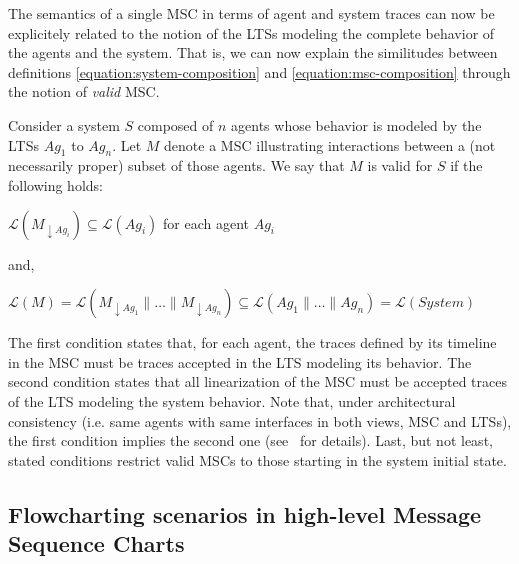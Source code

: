 The semantics of a single MSC in terms of agent and system traces can now be explicitely related to the notion of the LTSs modeling the complete behavior of the agents and the system. That is, we can now explain the similitudes between definitions \ref{equation:system-composition} and \ref{equation:msc-composition} through the notion of \emph{valid} MSC. 

Consider a system $S$ composed of $n$ agents whose behavior is modeled by the LTSs $Ag_1$ to $Ag_n$. Let $M$ denote a MSC illustrating interactions between a (not necessarily proper) subset of those agents. We say that $M$ is valid for $S$ if the following holds:

\begin{center}
$\mathcal{L}(M_{\downarrow Ag_i}) \subseteq \mathcal{L}(Ag_i)$ for each agent $Ag_i$
\end{center}

\noindent and,

\begin{center}
$\mathcal{L}(M) = \mathcal{L}(M_{\downarrow Ag_1} \parallel \ldots \parallel M_{\downarrow Ag_n}) \subseteq \mathcal{L}(Ag_1 \parallel \ldots \parallel Ag_n) = \mathcal{L}(System)$
\end{center}

The first condition states that, for each agent, the traces defined by its timeline in the MSC must be traces accepted in the LTS modeling its behavior. The second condition states that all linearization of the MSC must be accepted traces of the LTS modeling the system behavior. Note that, under architectural consistency (i.e. same agents with same interfaces in both views, MSC and LTSs), the first condition implies the second one (see~\cite{Uchitel:2003} for details). Last, but not least, stated conditions restrict valid MSCs to those starting in the system initial state.

\subsection{Flowcharting scenarios in high-level Message Sequence Charts}
